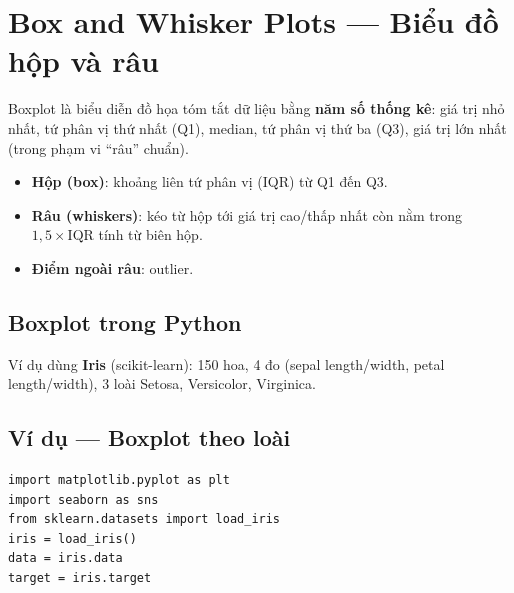 \section{Box and Whisker Plots --- Biểu đồ hộp và râu}
\label{sec:box-whisker}

\begin{dinhnghia}[title={Boxplot (Box and Whisker Plot)}]
Boxplot là biểu diễn đồ họa tóm tắt dữ liệu bằng \textbf{năm số thống kê}:
giá trị nhỏ nhất, tứ phân vị thứ nhất (Q1), median, tứ phân vị thứ ba (Q3), giá trị lớn nhất (trong phạm vi ``râu'' chuẩn).
\end{dinhnghia}

\begin{ynghia}[title={Cấu trúc boxplot}]
\begin{itemize}
  \item \textbf{Hộp (box)}: khoảng liên tứ phân vị (IQR) từ Q1 đến Q3.
  \item \textbf{Râu (whiskers)}: kéo từ hộp tới giá trị cao/thấp nhất còn nằm trong $1{,}5 \times \mathrm{IQR}$ tính từ biên hộp.
  \item \textbf{Điểm ngoài râu}: outlier.
\end{itemize}
\end{ynghia}

\subsection{Boxplot trong Python}

\begin{phuongphap}[title={Dataset Iris}]
Ví dụ dùng \textbf{Iris} (scikit-learn): 150 hoa, 4 đo (sepal length/width, petal length/width), 3 loài Setosa, Versicolor, Virginica.
\end{phuongphap}

\subsection{Ví dụ --- Boxplot theo loài}

\begin{vidu}[title={Nạp dữ liệu}]
\begin{lstlisting}
import matplotlib.pyplot as plt
import seaborn as sns
from sklearn.datasets import load_iris
iris = load_iris()
data = iris.data
target = iris.target
\end{lstlisting}
\end{vidu}

